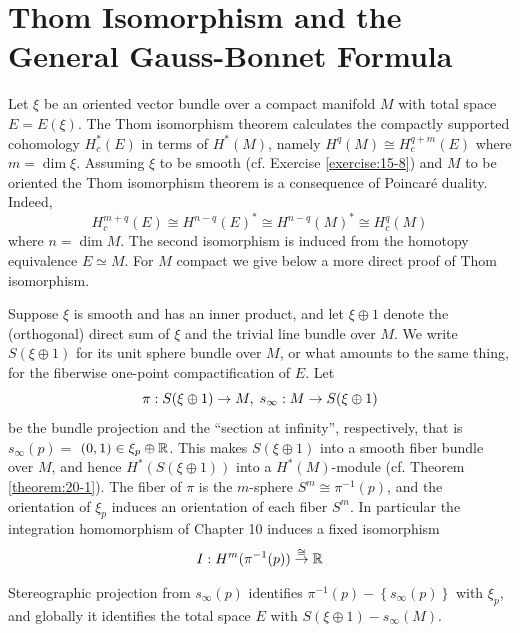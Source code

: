\chapter[Thom Isomorphism and the General Gauss-Bonnet Formula]{Thom Isomorphism and the General\IfFontTimesTF{\\}{} Gauss-Bonnet Formula}
Let $\xi$ be an oriented vector bundle over a compact manifold $M$ with total space $E = E( \xi )$. The Thom isomorphism theorem 
calculates the compactly supported cohomology $H_c^*( E)$ in terms of ${H}^*( M)$, 
namely ${H}^{q}( M)  \cong  H_c^{q + m}(E)$ where $m = \dim \xi$. Assuming $\xi$ to be 
smooth (cf. Exercise \ref{exercise:15-8}) and $M$ to be oriented the Thom isomorphism theorem is a consequence of 
Poincar\'e duality. Indeed,
\[
  H_c^{m + q}( E)  
  \cong  {H}^{n- q}{( E) }^* 
  \cong  {H}^{n- q}{( M) }^* 
  \cong  H_c^{q}( M)
\]
where $n = \dim M$. The second isomorphism is induced from the homotopy equivalence $E \simeq  M$. 
For $M$ compact we give below a more direct proof of Thom isomorphism.

Suppose $\xi$ is smooth and has an inner product, and let $\xi  \oplus  1$ denote the (orthogonal) direct 
sum of $\xi$ and the trivial line bundle over $M$. We write $S( {\xi  \oplus  1})$ for its unit sphere bundle 
over $M$, or what amounts to the same thing, for the fiberwise one-point compactification of $E$. Let
\[
  \pi: S( {\xi  \oplus  1})  \rightarrow  M,\;{s}_{\infty } : M \rightarrow  S( {\xi  \oplus  1})
\]
be the bundle projection and the ``section at infinity'', respectively, that 
is ${s}_{\infty }( p)  =$  $( {0,1})  \in  {\xi }_{p} \oplus  {\ensuremath{\mathbb{R}}}$. This makes $S( {\xi  \oplus  1})$ into 
a smooth fiber bundle over $M$, and hence ${H}^*( {S( {\xi  \oplus  1}) })$ into a ${H}^*( M)$-module 
(cf. Theorem \ref{theorem:20-1}). The fiber of $\pi$ is the $m$-sphere ${S}^{m} \cong  {\pi }^{-1}( p)$, and the 
orientation of ${\xi }_{p}$ induces an orientation of each fiber ${S}^{m}$. In particular the integration homomorphism 
of Chapter 10 induces a fixed isomorphism
\begin{align}\label{eq:21-1}
  I: H^m( {{\pi }^{-1}( p) }) \overset{ \cong  }{ \rightarrow  }{\mathbb{R}}
\end{align}

Stereographic projection from ${s}_{\infty }( p)$ identifies ${\pi }^{-1}( p) - \left\{  {{s}_{\infty }( p) }\right\}$ 
with ${\xi }_{p}$, and globally it identifies the total space $E$ with $S( {\xi  \oplus  1}) - {s}_{\infty }( M)$.

